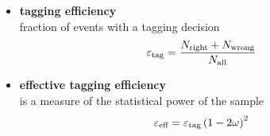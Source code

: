 {\begin{itemize}
\vspace{-1.1em}
\item \textbf{tagging efficiency} \\[0.04cm] 
fraction of events with a tagging decision
\begin{equation*}
\hspace{-1.6em}
\varepsilon_\text{tag}=\frac{N_{\text{right}}+N_{\text{wrong}}}{N_{\text{all}}}
\end{equation*}
\vspace{-1.1em}
\item \textbf{effective tagging efficiency} \\[0.04cm] 
is a measure of the statistical power of the sample
\vspace{-0.3em}
\begin{equation*}
\hspace{-1.6em}
\vspace{0.5em}
\varepsilon_\text{eff}=\varepsilon_\text{tag}\left(1-2\omega\right)^2
\end{equation*}
\end{itemize}


}
